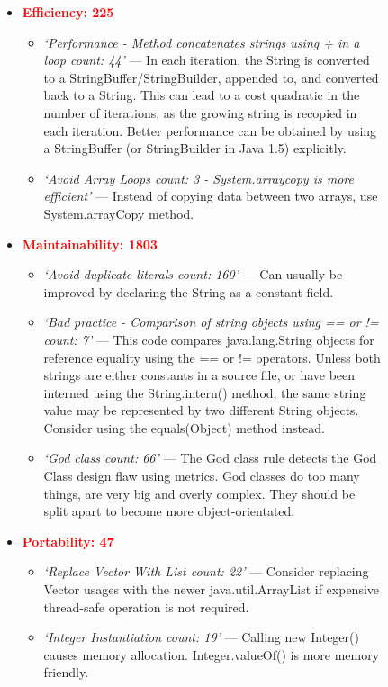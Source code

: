 \mediumlinespacing
\begin{figure}[tbp]
\begin{framed}
\begin{itemize}
    \item \textcolor{red}{\textbf{Efficiency: 225}}
    \begin{itemize}
        \item \textit{`Performance -  Method concatenates strings using + in a loop count: 44'} --- In each iteration, the String is converted to a StringBuffer/StringBuilder, appended to, and converted back to a String. This can lead to a cost quadratic in the number of iterations, as the growing string is recopied in each iteration. Better performance can be obtained by using a StringBuffer (or StringBuilder in Java 1.5) explicitly.
        \item \textit{`Avoid Array Loops count: 3 - System.arraycopy is more efficient'} --- Instead of copying data between two arrays, use System.arrayCopy method.
    \end{itemize}

    \item \textcolor{red}{\textbf{Maintainability: 1803}}
    \begin{itemize}
        \item \textit{`Avoid duplicate literals count: 160'} --- Can usually be improved by declaring the String as a constant field.
        \item \textit{`Bad practice - Comparison of string objects using == or != count: 7'} --- This code compares java.lang.String objects for reference equality using the == or != operators. Unless both strings are either constants in a source file, or have been interned using the String.intern() method, the same string value may be represented by two different String objects. Consider using the equals(Object) method instead.
        \item \textit{`God class count: 66'} --- The God class rule detects the God Class design flaw using metrics. God classes do too many things, are very big and overly complex. They should be split apart to become more object-orientated. 
    \end{itemize}
      
     \item \textcolor{red}{\textbf{Portability: 47}} 
    \begin{itemize}
        \item \textit{`Replace Vector With List count: 22'} ---
            Consider replacing Vector usages with the newer 
        java.util.ArrayList if expensive thread-safe operation is not required.
        \item \textit{`Integer Instantiation count: 19'} --- Calling new Integer() causes memory allocation. Integer.valueOf() is more memory friendly.
    \end{itemize}
    

\end{itemize}
\end{framed}
\end{figure}
